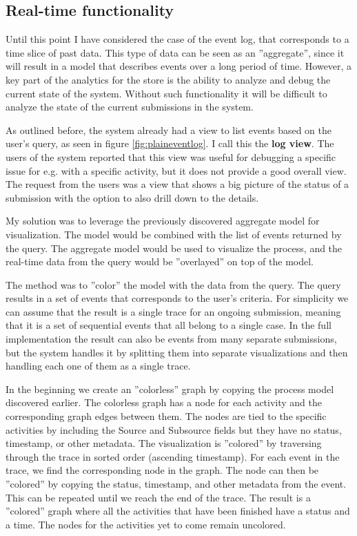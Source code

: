 \subsection{Real-time functionality}

Until this point I have considered the case of the event log, that corresponds to a time slice of past data.
This type of data can be seen as an ''aggregate'', since it will result in a model that describes events over a long period of time.
However, a key part of the analytics for the store is the ability to analyze and debug the current state of the system.
Without such functionality it will be difficult to analyze the state of the current submissions in the system.

As outlined before, the system already had a view to list events based on the user's query, as seen in figure \ref{fig:plaineventlog}.
I call this the \textbf{log view}.
The users of the system reported that this view was useful for debugging a specific issue for e.g. with a specific activity, but it does not provide a good overall view.
The request from the users was a view that shows a big picture of the status of a submission with the option to also drill down to the details.

My solution was to leverage the previously discovered aggregate model for visualization.
The model would be combined with the list of events returned by the query.
The aggregate model would be used to visualize the process, and the real-time data from the query would be ''overlayed'' on top of the model.

The method was to ''color'' the model with the data from the query.
The query results in a set of events that corresponds to the user's criteria.
For simplicity we can assume that the result is a single trace for an ongoing submission,
meaning that it is a set of sequential events that all belong to a single case.
In the full implementation the result can also be events from many separate submissions,
but the system handles it by splitting them into separate visualizations and then handling each one of them as a single trace.

In the beginning we create an ''colorless'' graph by copying the process model discovered earlier.
The colorless graph has a node for each activity and the corresponding graph edges between them.
The nodes are tied to the specific activities by including the Source and Subsource fields but they have no status, timestamp, or other metadata.
The visualization is ''colored'' by traversing through the trace in sorted order (ascending timestamp).
For each event in the trace, we find the corresponding node in the graph.
The node can then be ''colored'' by copying the status, timestamp, and other metadata from the event.
This can be repeated until we reach the end of the trace.
The result is a ''colored'' graph where all the activities that have been finished have a status and a time.
The nodes for the activities yet to come remain uncolored.

